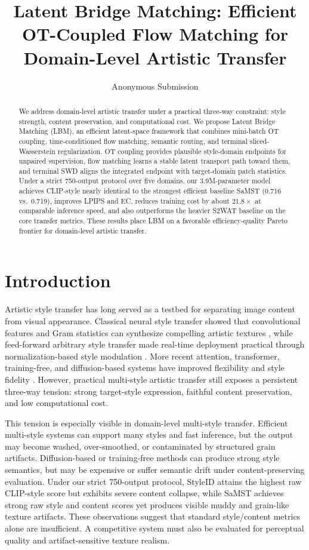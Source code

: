 ﻿\documentclass[letterpaper]{article}
\title{Latent Bridge Matching: Efficient OT-Coupled Flow Matching for Domain-Level Artistic Transfer}
\author{Anonymous Submission}
\begin{document}
\maketitle

\begin{abstract}
We address domain-level artistic transfer under a practical three-way constraint: style strength, content preservation, and computational cost. We propose Latent Bridge Matching (LBM), an efficient latent-space framework that combines mini-batch OT coupling, time-conditioned flow matching, semantic routing, and terminal sliced-Wasserstein regularization. OT coupling provides plausible style-domain endpoints for unpaired supervision, flow matching learns a stable latent transport path toward them, and terminal SWD aligns the integrated endpoint with target-domain patch statistics. Under a strict 750-output protocol over five domains, our 3.9M-parameter model achieves CLIP-style nearly identical to the strongest efficient baseline SaMST (0.716 vs.\ 0.719), improves LPIPS and EC, reduces training cost by about $21.8\times$ at comparable inference speed, and also outperforms the heavier S2WAT baseline on the core transfer metrics. These results place LBM on a favorable efficiency-quality Pareto frontier for domain-level artistic transfer.
\end{abstract}

\section{Introduction}
Artistic style transfer has long served as a testbed for separating image content from visual appearance. Classical neural style transfer showed that convolutional features and Gram statistics can synthesize compelling artistic textures \cite{gatys2016image}, while feed-forward arbitrary style transfer made real-time deployment practical through normalization-based style modulation \cite{huang2017adain}. More recent attention, transformer, training-free, and diffusion-based systems have improved flexibility and style fidelity \cite{park2019sanet,deng2022stytr2,hong2023aespa,huang2024aesfa,gim2024cast,chung2024styleid}. However, practical multi-style artistic transfer still exposes a persistent three-way tension: strong target-style expression, faithful content preservation, and low computational cost.

This tension is especially visible in domain-level multi-style transfer. Efficient multi-style systems can support many styles and fast inference, but the output may become washed, over-smoothed, or contaminated by structured grain artifacts. Diffusion-based or training-free methods can produce strong style semantics, but may be expensive or suffer semantic drift under content-preserving evaluation. Under our strict 750-output protocol, StyleID attains the highest raw CLIP-style score but exhibits severe content collapse, while SaMST achieves strong raw style and content scores yet produces visible muddy and grain-like texture artifacts. These observations suggest that standard style/content metrics alone are insufficient. A competitive system must also be evaluated for perceptual quality and artifact-sensitive texture realism.
\end{document}
